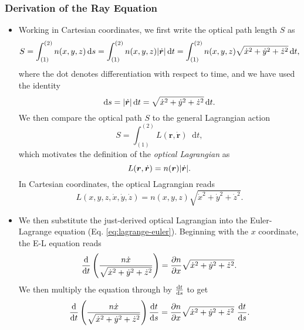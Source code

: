 \documentclass[11pt, a4paper]{article}
\newcommand{\diff}{\mathop{}\!\mathrm{d}} %
\renewcommand{\vec}[1]{\bm{#1}} %
\renewcommand{\r}{\vec{r}}  %
\begin{document}
\subsubsection{Derivation of the Ray Equation}
\begin{itemize}
    \item Working in Cartesian coordinates, we first write the optical path length $ S $ as
    \begin{equation*}
        S = \int_{(1)}^{(2)}n(x, y, z)\diff s = \int_{(1)}^{(2)} n(x, y, z)\abs{\dot{\vec{r}}} \diff t = \int_{(1)}^{(2)} n(x, y, z)\sqrt{\dot{x}^{2} + \dot{y}^{2} + \dot{z}^{2}} \diff t,
    \end{equation*}
    where the dot denotes differentiation with respect to time, and we have used the identity
    \begin{equation*}
        \diff s = \abs{\dot{\vec{r}}}\diff t = \sqrt{\dot{x}^{2} + \dot{y}^{2} + \dot{z}^{2}} \diff t.
    \end{equation*}
    We then compare the optical path $ S $ to the general Lagrangian action
    \begin{equation*}
        S = \int_{(1)}^{(2)} L(\r, \dot{\vec{r}}) \diff t,
    \end{equation*}
    which motivates the definition of the \textit{optical Lagrangian} as
    \begin{equation*}
        L(\r, \dot{\vec{r}})  = n(\r) \abs{\dot{\vec{r}}}.
    \end{equation*}
    In Cartesian coordinates, the optical Lagrangian reads
    \begin{equation*}
        L(x, y, z, \dot{x}, \dot{y}, \dot{z}) = n(x, y, z) \sqrt{\dot{x}^{2} + \dot{y}^{2} + \dot{z}^{2}}.
    \end{equation*}
    
    \item We then substitute the just-derived optical Lagrangian into the Euler-Lagrange equation (Eq. \ref{eq:lagrange-euler}). Beginning with the $ x $ coordinate, the E-L equation reads
    \begin{equation*}
        \dv{t} \left( \frac{n \dot{x}}{\sqrt{\dot{x}^{2} + \dot{y}^{2} + \dot{z}^{2}}} \right) = \pdv{n}{x} \sqrt{\dot{x}^{2} + \dot{y}^{2} + \dot{z}^{2}}.
    \end{equation*}
    We then multiply the equation through by $ \dv{t}{s} $ to get
    \begin{equation*}
        \dv{t} \left( \frac{n \dot{x}}{\sqrt{\dot{x}^{2} + \dot{y}^{2} + \dot{z}^{2}}} \right)\dv{t}{s} = \pdv{n}{x} \sqrt{\dot{x}^{2} + \dot{y}^{2} + \dot{z}^{2}} \ \dv{t}{s}.
    \end{equation*}
    

\end{itemize}
\end{document}
